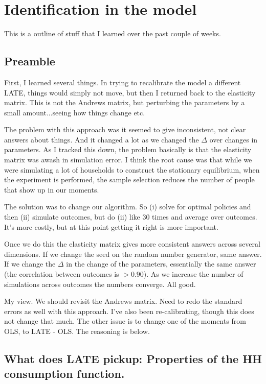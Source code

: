 \documentclass[pdftex,11pt]{article}
\begin{document}
\section{Identification in the model}

This is a outline of stuff that I learned over the past couple of weeks.

\subsection{Preamble}

First, I learned several things. In trying to recalibrate the model a different LATE, things would simply not move, but then I returned back to the elasticity matrix. This is not the Andrews matrix, but perturbing the parameters by a small amount...seeing how things change etc.

The problem with this approach was it seemed to give inconsistent, not clear answers about things. And it changed a lot as we changed the $\Delta$  over changes in parameters. As I tracked this down, the problem basically is  that the elasticity matrix was awash in simulation error. I think the root cause was that while we were simulating a lot of households to construct the stationary equilibrium, when the experiment is performed, the sample selection reduces the number of people that show up in our moments.

The solution was to change our algorithm. So (i) solve for optimal policies and then (ii) simulate outcomes, but do (ii) like 30 times and average over outcomes. It's more costly, but at this point getting it right is more important.

Once we do this the elasticity matrix gives more consistent answers across several dimensions. If we change the seed on the random number generator, same answer. If we change the $\Delta$ in the change of the parameters, essentially the same answer (the correlation between outcomes is $> 0.90$). As we increase the number of simulations across outcomes the numbers converge. All good.

My view. We should revisit the Andrews matrix. Need to redo the standard errors as well with this approach. I've also been re-calibrating, though this does not change that much. The other issue is to change one of the moments from OLS, to LATE - OLS. The reasoning is below.  

\subsection{What does LATE pickup: Properties of the HH consumption function.}
\end{document}
